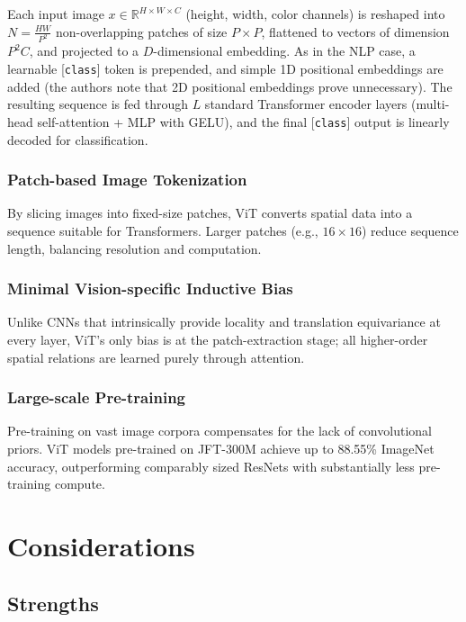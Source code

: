 \documentclass[10pt]{article}
\begin{document}
Each input image $x\in\mathbb{R}^{H\times W\times C}$ (height, width, color channels) is reshaped into $N = \tfrac{H W}{P^2}$ non-overlapping patches of size $P\times P$, flattened to vectors of dimension $P^2C$, and projected to a $D$-dimensional embedding. As in the NLP case, a learnable [\texttt{class}] token is prepended, and simple 1D positional embeddings are added (the authors note that 2D positional embeddings prove unnecessary). The resulting sequence is fed through $L$ standard Transformer encoder layers (multi-head self-attention + MLP with GELU), and the final [\texttt{class}] output is linearly decoded for classification.

\subsubsection*{Patch-based Image Tokenization}
By slicing images into fixed-size patches, ViT converts spatial data into a sequence suitable for Transformers. Larger patches (e.g., $16\times16$) reduce sequence length, balancing resolution and computation.

\subsubsection*{Minimal Vision-specific Inductive Bias}
Unlike CNNs that intrinsically provide locality and translation equivariance at every layer, ViT's only bias is at the patch-extraction stage; all higher-order spatial relations are learned purely through attention.

\subsubsection*{Large-scale Pre-training}
Pre-training on vast image corpora compensates for the lack of convolutional priors. ViT models pre-trained on JFT-300M achieve up to 88.55\% ImageNet accuracy, outperforming comparably sized ResNets with substantially less pre-training compute.



\section*{Considerations}
\subsection*{Strengths}
\end{document}
